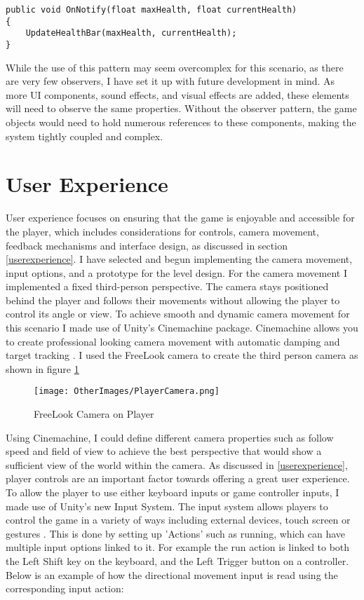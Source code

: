 \documentclass[]{final_report}
\begin{document}
\begin{verbatim}
public void OnNotify(float maxHealth, float currentHealth)
{
    UpdateHealthBar(maxHealth, currentHealth);
}
\end{verbatim}
While the use of this pattern may seem overcomplex for this scenario, as there are very few observers, I have set it up with future development in mind. As more UI components, sound effects, and visual effects are added, these elements will need to observe the same properties. Without the observer pattern, the game objects would need to hold numerous references to these components, making the system tightly coupled and complex. 

\section{User Experience}
User experience focuses on ensuring that the game is enjoyable and accessible for the player, which includes considerations for controls, camera movement, feedback mechanisms and interface design, as discussed in section \ref{userexperience}. I have selected and begun implementing the camera movement, input options, and a prototype for the level design.
For the camera movement I implemented a fixed third-person perspective. The camera stays positioned behind the player and follows their movements without allowing the player to control its angle or view. To achieve smooth and dynamic camera movement for this scenario I made use of Unity's Cinemachine package. Cinemachine allows you to create professional looking camera movement with automatic damping and target tracking \cite{onewheelstudio_2021}. I used the FreeLook camera to create the third person camera as shown in figure \ref{fig:label_camera}
\begin{figure}[H]
    \centering
    \texttt{[image: OtherImages/PlayerCamera.png]}
    \caption{FreeLook Camera on Player}
    \label{fig:label_camera}
\end{figure}
Using Cinemachine, I could define different camera properties such as follow speed and field of view to achieve the best perspective that would show a sufficient view of the world within the camera. \newline
As discussed in \ref{userexperience}, player controls are an important factor towards offering a great user experience. To allow the player to use either keyboard inputs or game controller inputs, I made use of Unity's new Input System. The input system allows players to control the game in a variety of ways including external devices, touch screen or gestures \cite{unity_2024_inputsystem}. This is done by setting up 'Actions' such as running, which can have multiple input options linked to it. For example the run action is linked to both the Left Shift key on the keyboard, and the Left Trigger button on a controller. Below is an example of how the directional movement input is read using the corresponding input action:
\end{document}
